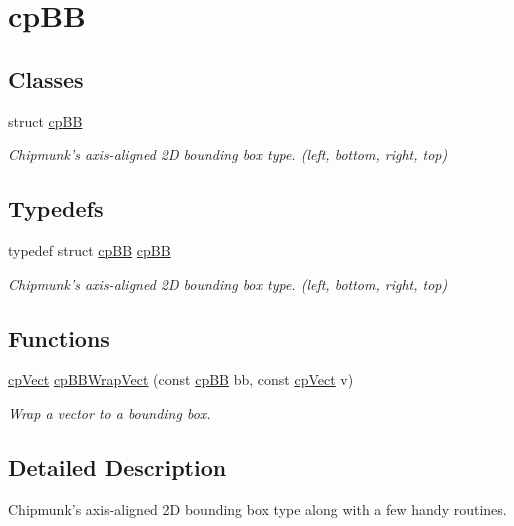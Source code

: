 \hypertarget{group__cp_b_b_b}{\section{cp\-B\-B}
\label{group__cp_b_b_b}
}
\subsection*{Classes}
\begin{DoxyCompactItemize}
\item 
struct \hyperlink{structcp_b_b}{cp\-B\-B}
\begin{DoxyCompactList}\small\item\em Chipmunk's axis-\/aligned 2\-D bounding box type. (left, bottom, right, top) \end{DoxyCompactList}\end{DoxyCompactItemize}
\subsection*{Typedefs}
\begin{DoxyCompactItemize}
\item 
\hypertarget{group__cp_b_b_b_ga94835b3c44de11eae51d596f39a5fabc}{typedef struct \hyperlink{structcp_b_b}{cp\-B\-B} \hyperlink{group__cp_b_b_b_ga94835b3c44de11eae51d596f39a5fabc}{cp\-B\-B}}\label{group__cp_b_b_b_ga94835b3c44de11eae51d596f39a5fabc}

\begin{DoxyCompactList}\small\item\em Chipmunk's axis-\/aligned 2\-D bounding box type. (left, bottom, right, top) \end{DoxyCompactList}\end{DoxyCompactItemize}
\subsection*{Functions}
\begin{DoxyCompactItemize}
\item 
\hypertarget{group__cp_b_b_b_gaf6f534fd78ebfb5b822f3f7c3da03b0d}{\hyperlink{structcp_vect}{cp\-Vect} \hyperlink{group__cp_b_b_b_gaf6f534fd78ebfb5b822f3f7c3da03b0d}{cp\-B\-B\-Wrap\-Vect} (const \hyperlink{structcp_b_b}{cp\-B\-B} bb, const \hyperlink{structcp_vect}{cp\-Vect} v)}\label{group__cp_b_b_b_gaf6f534fd78ebfb5b822f3f7c3da03b0d}

\begin{DoxyCompactList}\small\item\em Wrap a vector to a bounding box. \end{DoxyCompactList}\end{DoxyCompactItemize}


\subsection{Detailed Description}
Chipmunk's axis-\/aligned 2\-D bounding box type along with a few handy routines. 